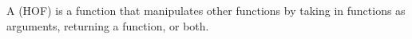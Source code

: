 A  (HOF) is a function that manipulates other functions by taking in functions as arguments, returning a function, or both.

